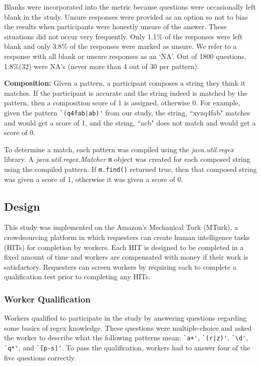 Blanks were incorporated into the metric because questions were occasionally left blank in the study. Unsure responses were provided as an option so not to bias the  results when participants were honestly unsure of the answer. These situations did not occur very frequently. Only 1.1\% of the responses were left blank and only 3.8\% of the responses were marked as unsure.  We refer to a response with all blank or unsure responses as an `NA'. Out of 1800 questions, 1.8\%(32) were NA's (never more than 4 out of 30 per pattern).

\textbf{Composition:}
Given a pattern, a participant composes a string they think it matches. If the participant is accurate and the string indeed is matched by the pattern, then a composition score of 1 is assigned, otherwise 0.  For example, given the pattern \verb!`(q4fab|ab)'! from our study, the string, ``xyzq4fab" matches  and would get a score of 1, and the string, ``acb" does not match and would get a score of 0.

To determine a match, each pattern was compiled using the \emph{java.util.regex} library. A \emph{java.util.regex.Matcher} \verb!m! object was created for each composed string using the compiled pattern.  If \verb!m.find()! returned true, then that composed string was given a score of 1, otherwise it was given a score of 0.

\subsection{Design}
This study was implemented on the Amazon's Mechanical Turk (MTurk),  a crowdsourcing platform in which requesters can create human intelligence tasks (HITs) for completion by workers. Each HIT is designed to be completed in a fixed amount of time and workers are compensated with money if their work is satisfactory. Requesters can screen workers by requiring each to complete a qualification test prior to completing any HITs.

\subsubsection{Worker Qualification}
Workers qualified to participate in the study by answering questions regarding some basics of regex knowledge. These questions were multiple-choice and asked the worker to describe what the following patterns mean: \verb!`a+'!, \verb!`(r|z)'!, \verb!`\d'!, \verb!`q*'!, and \verb!`[p-s]'!. To pass the qualification, workers had to answer four of the five questions correctly.

